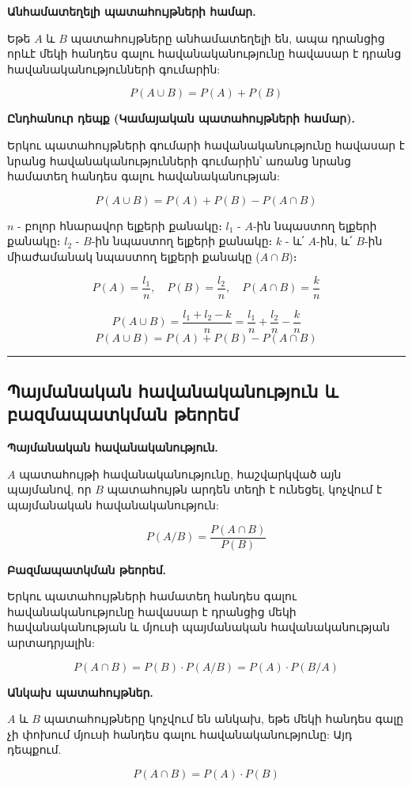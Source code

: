 \documentclass[12pt, a4paper]{article}
\begin{document}
\textbf{Անհամատեղելի պատահույթների համար.}

Եթե $A$ և $B$ պատահույթները անհամատեղելի են, ապա դրանցից որևէ մեկի հանդես գալու հավանականությունը հավասար է դրանց հավանականությունների գումարին:

$$P(A \cup B) = P(A) + P(B)$$

\textbf{Ընդհանուր դեպք (Կամայական պատահույթների համար).}

Երկու պատահույթների գումարի հավանականությունը հավասար է նրանց հավանականությունների գումարին՝ առանց նրանց համատեղ հանդես գալու հավանականության:

$$P(A \cup B) = P(A) + P(B) - P(A \cap B)$$

$n$ - բոլոր հնարավոր ելքերի քանակը։
$l_1$ - $A$-ին նպաստող ելքերի քանակը։
$l_2$ - $B$-ին նպաստող ելքերի քանակը։
$k$ - և՛ $A$-ին, և՛ $B$-ին միաժամանակ նպաստող ելքերի քանակը ($A \cap B$)։

$$P(A) = \frac{l_1}{n}, \quad P(B) = \frac{l_2}{n}, \quad P(A \cap B) = \frac{k}{n}$$

$$P(A \cup B) = \frac{l_1 + l_2 - k}{n} = \frac{l_1}{n} + \frac{l_2}{n} - \frac{k}{n}$$
$$P(A \cup B) = P(A) + P(B) - P(A \cap B)$$

\vspace{1em}
\hrule
\vspace{1em}

\subsection{Պայմանական հավանականություն և բազմապատկման թեորեմ}

\textbf{Պայմանական հավանականություն.}

$A$ պատահույթի հավանականությունը, հաշվարկված այն պայմանով, որ $B$ պատահույթն արդեն տեղի է ունեցել, կոչվում է պայմանական հավանականություն:

$$P(A/B) = \frac{P(A \cap B)}{P(B)}$$

\textbf{Բազմապատկման թեորեմ.}

Երկու պատահույթների համատեղ հանդես գալու հավանականությունը հավասար է դրանցից մեկի հավանականության և մյուսի պայմանական հավանականության արտադրյալին:

$$P(A \cap B) = P(B) \cdot P(A/B) = P(A) \cdot P(B/A)$$

\textbf{Անկախ պատահույթներ.}

$A$ և $B$ պատահույթները կոչվում են անկախ, եթե մեկի հանդես գալը չի փոխում մյուսի հանդես գալու հավանականությունը: Այդ դեպքում.

$$P(A \cap B) = P(A) \cdot P(B)$$
\end{document}
